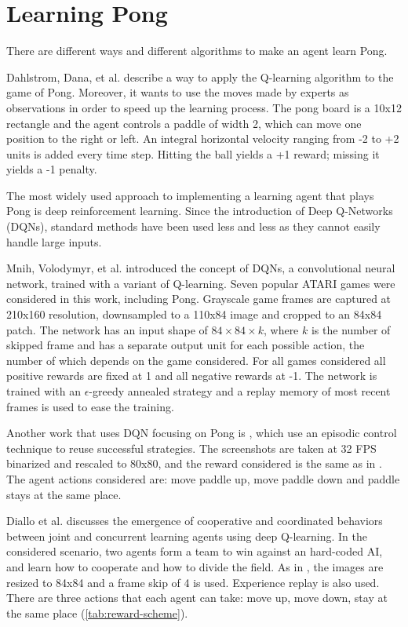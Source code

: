 \section{Learning Pong}
\label{sec:pong}
There are different ways and different algorithms to make an agent learn Pong.

Dahlstrom, Dana, et al. \cite{dahlstrom2002imitative} describe a way to apply the Q-learning algorithm to the game of Pong. Moreover, it wants to use the moves made by experts as observations in order to speed up the learning process. 
The pong board is a 10x12 rectangle and the agent controls a paddle of width 2, which can move one position to the right or left.
An integral horizontal velocity ranging from -2 to +2 units is added every time step. Hitting the ball yields a +1 reward; missing it yields a -1 penalty.

The most widely used approach to implementing a learning agent that plays Pong is deep reinforcement learning.
Since the introduction of Deep Q-Networks (DQNs), standard methods have been used less and less as they cannot easily handle large inputs.

Mnih, Volodymyr, et al. \cite{mnih2013playing} introduced the concept of DQNs, a convolutional neural network, trained with a variant of Q-learning.
Seven popular ATARI games were considered in this work, including Pong.
%
Grayscale game frames are captured at 210x160 resolution, downsampled to a 110x84 image and cropped to an 84x84 patch.
%
The network has an input shape of $84\times 84\times k$, where $k$ is the number of skipped frame and has a separate output unit for each possible action, 
the number of which depends on the game considered. 
For all games considered all positive rewards are fixed at 1 and all negative rewards at -1.
%
The network is trained with an $\epsilon$-greedy annealed strategy and a replay memory of most recent frames is used to ease the training.

Another work that uses DQN focusing on Pong is \cite{makarov2017learning}, which use an episodic control technique \cite{blundell2016model} to reuse successful
strategies.
%
The screenshots are taken at 32 FPS binarized and rescaled to 80x80, and the reward considered is the same as in \cite{mnih2013playing}.
The agent actions considered are: move paddle up, move paddle down and paddle stays at the same place.

Diallo et al. \cite{diallo2017learning} discusses the emergence of cooperative and coordinated behaviors between joint and concurrent learning
agents using deep Q-learning. 
%
In the considered scenario, two agents form a team to win against an hard-coded AI,
and learn how to cooperate and how to divide the field.
%
As in \cite{mnih2013playing}, the images are resized to 84x84 and a frame skip of 4 is used.
Experience replay is also used.
%
There are three actions that each agent can take: move up, move down, stay at the same place (\cref{tab:reward-scheme}).

